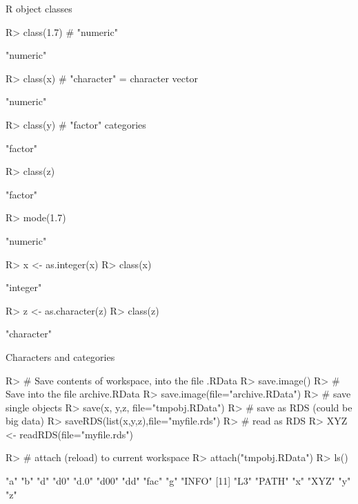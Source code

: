 \documentclass[10pt]{beamer}
\let\proglang=\textsf
\begin{document}
\begin{frame}[fragile]{\proglang{R} object classes}
\begin{Schunk}
\begin{Sinput}
R> 		class(1.7) # "numeric"
\end{Sinput}
\begin{Soutput}
[1] "numeric"
\end{Soutput}
\begin{Sinput}
R> class(x)   # "character" = character vector
\end{Sinput}
\begin{Soutput}
[1] "numeric"
\end{Soutput}
\begin{Sinput}
R> class(y)   # "factor" categories
\end{Sinput}
\begin{Soutput}
[1] "factor"
\end{Soutput}
\begin{Sinput}
R> class(z)
\end{Sinput}
\begin{Soutput}
[1] "factor"
\end{Soutput}
\begin{Sinput}
R> mode(1.7)
\end{Sinput}
\begin{Soutput}
[1] "numeric"
\end{Soutput}
\begin{Sinput}
R> x <- as.integer(x)
R> class(x)
\end{Sinput}
\begin{Soutput}
[1] "integer"
\end{Soutput}
\begin{Sinput}
R> z <- as.character(z)
R> class(z)
\end{Sinput}
\begin{Soutput}
[1] "character"
\end{Soutput}
\end{Schunk}
\end{frame}
%
\begin{frame}[fragile]{Characters and categories}
\begin{Schunk}
\begin{Sinput}
R> # Save contents of workspace, into the file .RData
R> 		save.image()
R> # Save into the file archive.RData
R> save.image(file="archive.RData")
R> # save single objects
R> save(x, y,z, file="tmpobj.RData")
R> # save as RDS (could be big data)
R> saveRDS(list(x,y,z),file="myfile.rds")
R> # read as RDS
R> XYZ <- readRDS(file="myfile.rds")
\end{Sinput}
\end{Schunk}
\begin{Schunk}
\begin{Sinput}
R> # attach (reload) to current workspace
R> 		attach("tmpobj.RData")
R> ls()
\end{Sinput}
\begin{Soutput}
 [1] "a"    "b"    "d"    "d0"   "d.0"  "d00"  "dd"   "fac"  "g"    "INFO"
[11] "L3"   "PATH" "x"    "XYZ"  "y"    "z"   
\end{Soutput}
\end{Schunk}
\end{frame}
\end{document}
